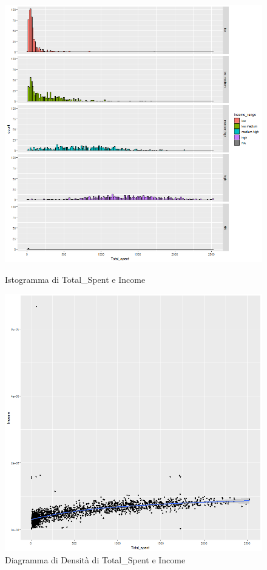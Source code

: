 \documentclass[letterpaper,11pt]{article}
\begin{document}
\begin{figure}[h]
  \centering
  \begin{minipage}[b]{0.4\textwidth}
    \includegraphics[width=\textwidth]{Img/EDA/EDA033.png}
    \caption{Istogramma di Total\_Spent e Income}
     \label{fig:IstogrammaTsIncome}
  \end{minipage}
  \hfill
  \begin{minipage}[b]{0.4\textwidth}
    \includegraphics[width=\textwidth]{Img/EDA/EDA034.png}
    \caption{Diagramma di Densità di Total\_Spent e Income}
     \label{fig:DensitaTsIncome}
  \end{minipage}
\end{figure}
\end{document}
